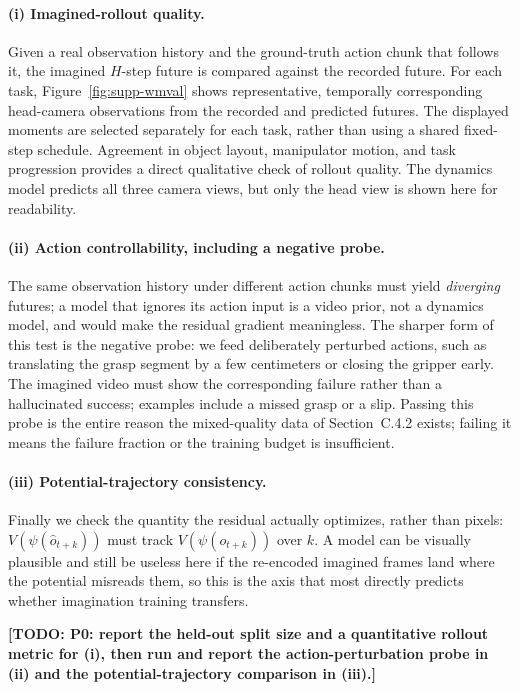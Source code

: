 \documentclass[letterpaper]{article} %
\newcommand{\todo}[1]{\textbf{[TODO: #1]}}
\begin{document}
\paragraph{(i) Imagined-rollout quality.}
Given a real observation history and the ground-truth action chunk that follows
it, the imagined $H$-step future is compared against the recorded future.
For each task, Figure~\ref{fig:supp-wmval} shows representative, temporally
corresponding head-camera observations from the recorded and predicted futures.
The displayed moments are selected separately for each task, rather than using
a shared fixed-step schedule. Agreement in object layout, manipulator motion,
and task progression provides a direct qualitative check of rollout quality.
The dynamics model predicts all three camera views, but only the head view is
shown here for readability.

\paragraph{(ii) Action controllability, including a negative probe.}
The same observation history under different action chunks must yield
\emph{diverging} futures; a model that ignores its action input is a video prior,
not a dynamics model, and would make the residual gradient meaningless. The
sharper form of this test is the negative probe: we feed deliberately perturbed
actions, such as translating the grasp segment by a few centimeters or closing the gripper
early. The imagined video must show the corresponding failure rather than a hallucinated
success; examples include a missed grasp or a slip. Passing this probe is the entire reason the
mixed-quality data of Section~C.4.2 exists; failing it means the failure fraction
or the training budget is insufficient.

\paragraph{(iii) Potential-trajectory consistency.}
Finally we check the quantity the residual actually optimizes, rather than
pixels: $V(\psi(\hat{o}_{t+k}))$ must track $V(\psi(o_{t+k}))$ over $k$. A model
can be visually plausible and still be useless here if the re-encoded imagined
frames land where the potential misreads them, so this is the axis that most
directly predicts whether imagination training transfers.

\todo{P0: report the held-out split size and a quantitative rollout metric for
(i), then run and report the action-perturbation probe in (ii) and the
potential-trajectory comparison in (iii).}
\end{document}
